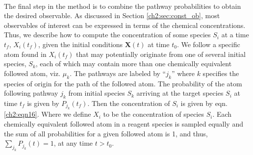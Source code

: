 \paragraph{}
The final step in the method is to combine the pathway
probabilities to obtain the desired observable. As discussed in Section \ref{ch2:sec:const_ob}, most observables
of interest can be expressed in terms of the chemical
concentrations. Thus, we describe how to compute the
concentration of some species $S_i$ at a time $t_f$, $X_i(t_f)$, given the
initial conditions $\mathbf{X}(t)$ at time $t_0$. We follow a specific atom found
in $X_i(t_f)$ that may potentially originate from one of several
initial species, $S_k$, each of which may contain more than one
chemically equivalent followed atom, viz. $\mu_k$. The pathways are
labeled by “$j_k$” where $k$ specifies the species of origin for the
path of the followed atom. The probability of the atom
following pathway $j_k$ from initial species $S_k$ arriving at the
target species $S_i$ at time $t_f$ is given by $P_{j_k}(t_f)$. Then the
concentration of $S_i$ is given by eqn. \ref{ch2:eqn16}. Where we define $X_i$ to be the concentration of species $S_i$. Each
chemically equivalent followed atom in a reagent species is
sampled equally and the sum of all probabilities for a given
followed atom is 1, and thus, $\sum_{j_k}{P_{j_k}(t)} = 1$, at any time $t>t_0$.

